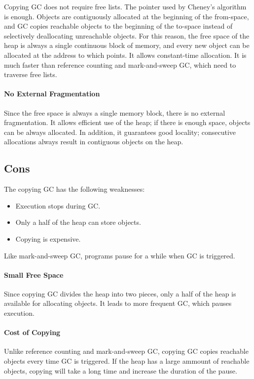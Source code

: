 Copying GC does not require free lists. The  pointer used by Cheney's
algorithm is enough. Objects are contiguously allocated at the beginning of the
from-space, and GC copies reachable objects to the beginning of the to-space
instead of selectively deallocating unreachable objects. For this reason, the
free space of the heap is always a single continuous block of memory, and every
new object can be allocated at the address to which  points. It
allows constant-time allocation. It is much faster than reference counting and
mark-and-sweep GC, which need to traverse free lists.

\paragraph{No External Fragmentation}

Since the free space is always a single memory block, there is no external
fragmentation. It allows efficient use of the heap; if there is enough space,
objects can be always allocated. In addition, it guarantees good locality;
consecutive allocations always result in contiguous objects on the heap.

\subsection{Cons}

The copying GC has the following weaknesses:

\begin{itemize}
  \item Execution stops during GC.
  \item Only a half of the heap can store objects.
  \item Copying is expensive.
\end{itemize}

Like mark-and-sweep GC, programs pause for a while when GC is triggered.

\paragraph{Small Free Space}

Since copying GC divides the heap into two pieces, only a half of the heap is
available for allocating objects. It leads to more frequent GC, which pauses
execution.

\paragraph{Cost of Copying}

Unlike reference counting and mark-and-sweep GC, copying GC copies reachable
objects every time GC is triggered. If the heap has a large ammount of reachable
objects, copying will take a long time and increase the duration of the pause.
